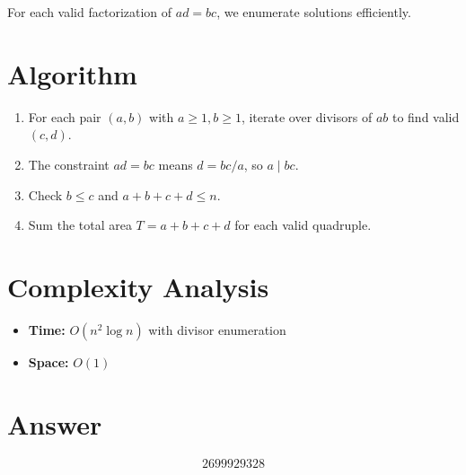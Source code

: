 \documentclass[11pt]{article}
\begin{document}
For each valid factorization of $ad = bc$, we enumerate solutions efficiently.

\section{Algorithm}
\begin{enumerate}
    \item For each pair $(a, b)$ with $a \geq 1, b \geq 1$, iterate over divisors of $ab$ to find valid $(c, d)$.
    \item The constraint $ad = bc$ means $d = bc/a$, so $a \mid bc$.
    \item Check $b \leq c$ and $a + b + c + d \leq n$.
    \item Sum the total area $T = a + b + c + d$ for each valid quadruple.
\end{enumerate}

\section{Complexity Analysis}
\begin{itemize}
    \item \textbf{Time:} $O(n^2 \log n)$ with divisor enumeration
    \item \textbf{Space:} $O(1)$
\end{itemize}

\section{Answer}

\[
\boxed{2699929328}
\]
\end{document}
